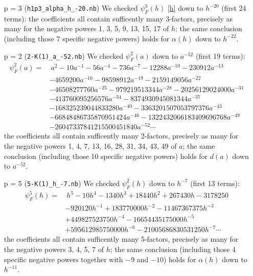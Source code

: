 \documentclass{rs}
\theoremstyle{definition}
\theoremstyle{remark}
\newcommand{\A}{\alpha}
\newcommand{\p}{\psi^3}
\renewcommand{\=}{\approx}
\renewcommand{\-}{\sim}
\numberwithin{equation}{section}
\numberwithin{thm}{section}
\begin{document}
\begin{itemize}
 \item [p = 3] (\texttt{h1p3\_alpha\_h\_-20.nb}) We checked $\p_F(h)$ \eqref{h} down to $h^{-20}$ (first 24 terms): 
 the coefficients all contain sufficently many 3-factors, 
 precisely as many for the negative powers 1, 3, 5, 9, 13, 15, 17 of $h$; 
 the same conclusion (including those 7 specific negative powers) holds for $\A(h)$ down to $h^{-22}$.  

 \item [p = 2] (\texttt{2-K(1)\_a\_-52.nb}) We checked $\psi^2_F(a)$ down to $a^{-52}$ (first 19 terms): 
 \begin{equation*}
 \begin{split}
  \psi^2_F(a) = & ~ a^2 - 10 a^{-1} - 56 a^{-4} - 736 a^{-7} - 12288 a^{-10} - 230912 a^{-13} \\
                & - 4659200 a^{-16} - 98598912 a^{-19} - 2159149056 a^{-22} \\
                & - 46508277760 a^{-25} - 979219513344 a^{-28} - 20256129024000 a^{-31} \\
                & - 413760095256576 a^{-34} - 8374930945081344 a^{-37} \\
                & - 168325239044833280 a^{-40} - 3363201507053797376 a^{-43} \\
                & - 66848486735870951424 a^{-46} - 1322432066183409696768 a^{-49} \\
                & - 26047337841215500451840 a^{-52} \cdots 
 \end{split}
 \end{equation*}
 the coefficients all contain sufficently many 2-factors, 
 precisely as many for the negative powers 1, 4, 7, 13, 16, 28, 31, 34, 43, 49 of $a$; 
 the same conclusion (including those 10 specific negative powers) holds for $d(a)$ down to $a^{-52}$.  

 \item [p = 5] (\texttt{5-K(1)\_h\_-7.nb}) We checked $\psi^2_F(h)$ down to $h^{-7}$ (first 13 terms): 
 \begin{equation*}
 \begin{split}
  \psi^5_F(h) = & ~ h^5 - 10 h^4 - 1340 h^3 + 18440 h^2 + 267430 h - 3178250 \\
                & - 920120 h^{-1} + 183770000 h^{-2} - 11467367375 h^{-3} \\
                & + 449827523750 h^{-4} - 16654435175000 h^{-5} \\
                & + 595612985750000 h^{-6} - 21005686830531250 h^{-7} \cdots 
 \end{split}
 \end{equation*}
 the coefficients all contain sufficently many 5-factors, 
 precisely as many for the negative powers 3, 4, 5, 7 of $h$; 
 the same conclusion (including those 4 specific negative powers together with $-9$ and $-10$) holds for $\A(h)$ down to $h^{-11}$.  \\
\end{itemize}
\end{document}
